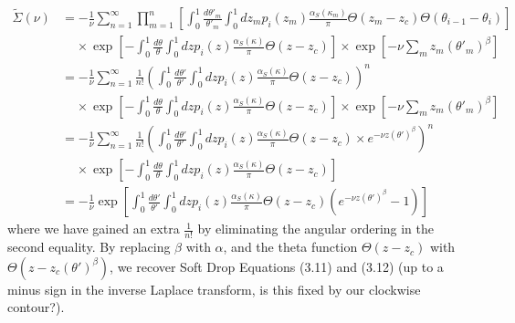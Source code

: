 \begin{align}
    \tilde\Sigma(\nu) &= -\frac{1}{\nu} \sum_{n=1}^\infty \prod_{m=1}^n  \left[\int_0^{1} \frac{d\theta'_m}{\theta'_m}\int_0^1 dz_m p_i(z_m) \frac{\alpha_S(\kappa_m)}{\pi}\Theta(z_m - z_c) \Theta(\theta_{i-1} - \theta_i)\right]\\
    &\ \ \ \ \ \times \exp\left[-\int_0^1\frac{d\theta}{\theta}\int_0^1 dz p_i(z) \frac{\alpha_S(\kappa)}{\pi}\Theta(z - z_c)\right] \times \exp\left[ -\nu \sum_m z_m(\theta'_m)^\beta\right]
    \\
    &= -\frac{1}{\nu} \sum_{n=1}^\infty \frac{1}{n!}\left(\int_0^{1} \frac{d\theta'}{\theta'}\int_0^1 dz p_i(z) \frac{\alpha_S(\kappa)}{\pi}\Theta(z - z_c) \right)^n\\
    &\ \ \ \ \ \times \exp\left[-\int_0^1\frac{d\theta}{\theta}\int_0^1 dz p_i(z) \frac{\alpha_S(\kappa)}{\pi}\Theta(z - z_c)\right] \times \exp\left[ -\nu \sum_m z_m(\theta'_m)^\beta\right]
    \\
    &= -\frac{1}{\nu} \sum_{n=1}^\infty \frac{1}{n!}\left(\int_0^{1} \frac{d\theta'}{\theta'}\int_0^1 dz p_i(z) \frac{\alpha_S(\kappa)}{\pi}\Theta(z - z_c) \times e^{-\nu z (\theta')^\beta}\right)^n\\
    &\ \ \ \ \ \times \exp\left[-\int_0^1\frac{d\theta}{\theta}\int_0^1 dz p_i(z) \frac{\alpha_S(\kappa)}{\pi}\Theta(z - z_c)\right]
    \\
    &=  -\frac{1}{\nu} \exp\left[\int_0^{1} \frac{d\theta'}{\theta'}\int_0^1 dz p_i(z) \frac{\alpha_S(\kappa)}{\pi}\Theta(z - z_c) \left( e^{-\nu z (\theta')^\beta} - 1 \right)\right]
\end{align}
where we have gained an extra \(\frac{1}{n!}\) by eliminating the angular ordering in the second equality. By replacing \(\beta\) with \(\alpha\), and the theta function \(\Theta(z - z_c)\) with \(\Theta(z - z_c (\theta')^\beta)\), we recover Soft Drop Equations (3.11) and (3.12) (up to a minus sign in the inverse Laplace transform, is this fixed by our clockwise contour?).

